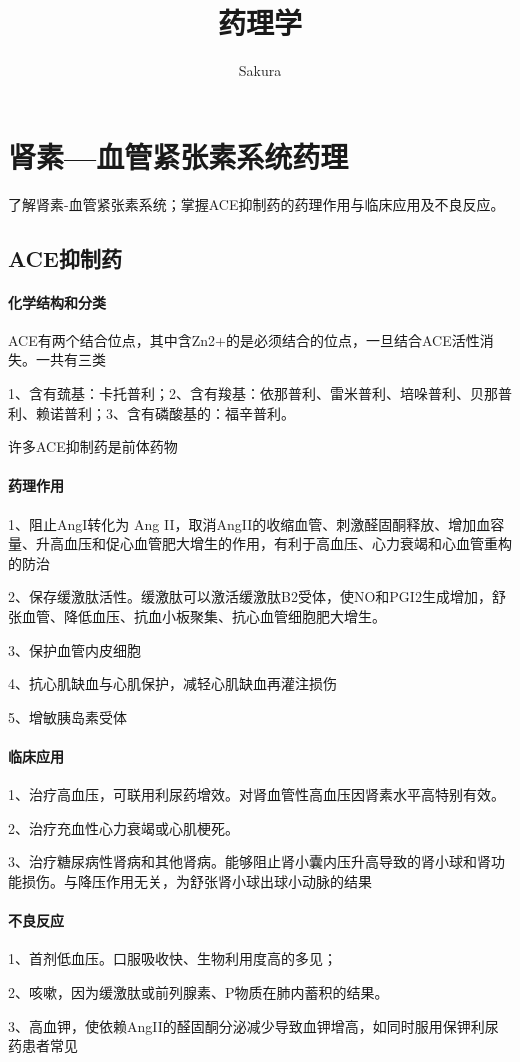 \documentclass[UTF8]{ctexbook}
\title{药理学}
\author{Sakura}
\begin{document}
\tableofcontents
\setcounter{chapter}{22}
\chapter{肾素—血管紧张素系统药理}
了解肾素-血管紧张素系统；掌握ACE抑制药的药理作用与临床应用及不良反应。
\section{ACE抑制药}
\subsubsection{化学结构和分类}
ACE有两个结合位点，其中含Zn2+的是必须结合的位点，一旦结合ACE活性消失。一共有三类

1、含有巯基：卡托普利；2、含有羧基：依那普利、雷米普利、培哚普利、贝那普利、赖诺普利；3、含有磷酸基的：福辛普利。

许多ACE抑制药是前体药物

\subsubsection{药理作用}
1、阻止AngI转化为 Ang II，取消AngII的收缩血管、刺激醛固酮释放、增加血容量、升高血压和促心血管肥大增生的作用，有利于高血压、心力衰竭和心血管重构的防治

2、保存缓激肽活性。缓激肽可以激活缓激肽B2受体，使NO和PGI2生成增加，舒张血管、降低血压、抗血小板聚集、抗心血管细胞肥大增生。

3、保护血管内皮细胞

4、抗心肌缺血与心肌保护，减轻心肌缺血再灌注损伤

5、增敏胰岛素受体
\subsubsection{临床应用}
1、治疗高血压，可联用利尿药增效。对肾血管性高血压因肾素水平高特别有效。

2、治疗充血性心力衰竭或心肌梗死。

3、治疗糖尿病性肾病和其他肾病。能够阻止肾小囊内压升高导致的肾小球和肾功能损伤。与降压作用无关，为舒张肾小球出球小动脉的结果
\subsubsection{不良反应}
1、首剂低血压。口服吸收快、生物利用度高的多见；

2、咳嗽，因为缓激肽或前列腺素、P物质在肺内蓄积的结果。

3、高血钾，使依赖AngII的醛固酮分泌减少导致血钾增高，如同时服用保钾利尿药患者常见
\end{document}
